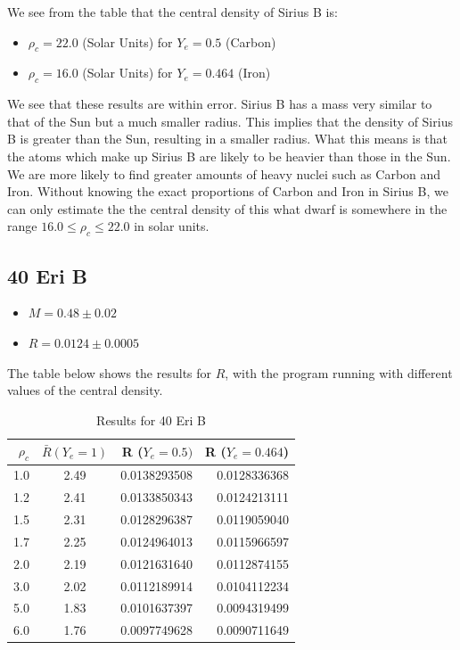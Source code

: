 \documentclass[a4paper]{IEEEtran}
\begin{document}
We see from the table that the central density of Sirius B is:
\begin{itemize}
    \item $\rho_c = 22.0$ (Solar Units) for $Y_e = 0.5$ (Carbon)
    \item $\rho_c = 16.0$ (Solar Units) for $Y_e = 0.464$ (Iron)
\end{itemize}
We see that these results are within error. Sirius B has a mass very similar
to that of the Sun but a much smaller radius. This implies that the density
of Sirius B is greater than the Sun, resulting in a smaller radius.
What this means is that the atoms which make up Sirius B are likely to
be heavier than those in the Sun. We are more likely to find greater
amounts of heavy nuclei such as Carbon and Iron.
Without knowing the exact proportions of Carbon and Iron in Sirius B,
we can only estimate the the central density of this what dwarf is
somewhere in the range $16.0 \leq \rho_c \leq 22.0$ in solar units.

\subsection{40 Eri B}
\begin{itemize}
      \item $M = 0.48 \pm 0.02 $
      \item $R = 0.0124 \pm 0.0005 $
\end{itemize}
The table below shows the results for $R$, with the program running
with different values of the central density.

\begin{table}
\caption{Results for 40 Eri B} 
\label{tbl:results-40-eri-b} 
\begin{center}
\begin{tabular}{r|crr} \hline
$\rho_c$    &   $\bar{R}(Y_e=1)$   & R ($Y_e = 0.5)$   & R ($Y_e = 0.464$)\\ \hline
1.0         &   2.49        & 0.0138293508      & 0.0128336368 \\
1.2         &   2.41        & 0.0133850343      & 0.0124213111 \\
1.5         &   2.31        & 0.0128296387      & 0.0119059040 \\
1.7         &   2.25        & 0.0124964013      & 0.0115966597 \\
2.0         &   2.19        & 0.0121631640       & 0.0112874155 \\
3.0         &   2.02        & 0.0112189914      & 0.0104112234 \\
5.0         &   1.83        & 0.0101637397      & 0.0094319499 \\
6.0         &   1.76        & 0.0097749628     & 0.0090711649 \\ \hline
\end{tabular}
\end{center}
\end{table} 
\end{document}
